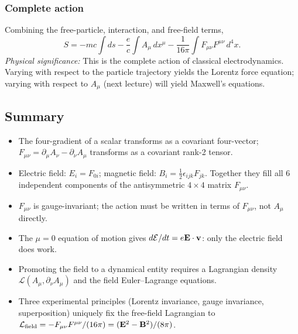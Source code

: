 \subsubsection*{Complete action}

Combining the free-particle, interaction, and free-field terms,
\begin{equation}\label{eq:S-total}
  \boxed{S = -mc\!\int\! ds
        -\frac{e}{c}\!\int\! A_\mu\,dx^\mu
        -\frac{1}{16\pi}\!\int\! F_{\mu\nu}F^{\mu\nu}\,d^4x.}
\end{equation}
\textit{Physical significance:} This is the complete action of classical electrodynamics.  Varying with respect to the particle trajectory yields the Lorentz force equation; varying with respect to $A_\mu$ (next lecture) will yield Maxwell's equations.

\subsection*{Summary}

\begin{itemize}
  \item The four-gradient of a scalar transforms as a covariant four-vector; $F_{\mu\nu} = \partial_\mu A_\nu - \partial_\nu A_\mu$ transforms as a covariant rank-2 tensor.
  \item Electric field: $E_i = F_{0i}$; magnetic field: $B_i = \tfrac{1}{2}\epsilon_{ijk}F_{jk}$.  Together they fill all 6 independent components of the antisymmetric $4\times4$ matrix $F_{\mu\nu}$.
  \item $F_{\mu\nu}$ is gauge-invariant; the action must be written in terms of $F_{\mu\nu}$, not $A_\mu$ directly.
  \item The $\mu=0$ equation of motion gives $d\mathcal{E}/dt = e\mathbf{E}\cdot\mathbf{v}$: only the electric field does work.
  \item Promoting the field to a dynamical entity requires a Lagrangian density $\mathcal{L}(A_\mu,\partial_\nu A_\mu)$ and the field Euler--Lagrange equations.
  \item Three experimental principles (Lorentz invariance, gauge invariance, superposition) uniquely fix the free-field Lagrangian to $\mathcal{L}_{\rm field} = -F_{\mu\nu}F^{\mu\nu}/(16\pi) = (\mathbf{E}^2-\mathbf{B}^2)/(8\pi)$.
\end{itemize}
